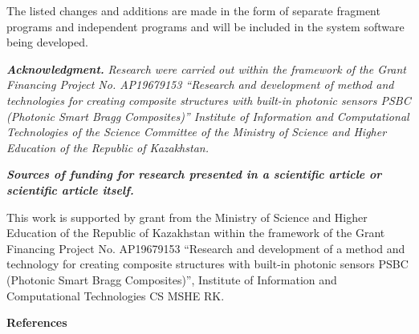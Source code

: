 \begin{multicols}{2}
The listed changes and additions are made in the form of separate
fragment programs and independent programs and will be included in the
system software being developed.

\emph{{\bfseries Acknowledgment.}} \emph{Research were carried out within
the framework of the Grant Financing Project No. AP19679153 ``Research
and development of method and technologies for creating composite
structures with built-in photonic sensors PSBC (Photonic Smart Bragg
Composites)'' Institute of Information and Computational Technologies of
the Science Committee of the Ministry of Science and Higher Education of
the Republic of Kazakhstan.}

\emph{{\bfseries Sources of funding for research presented in a scientific
article or scientific article itself.}}

This work is supported by grant from the Ministry of Science and Higher
Education of the Republic of Kazakhstan within the framework of the
Grant Financing Project No. AP19679153 ``Research and development of a
method and technology for creating composite structures with built-in
photonic sensors PSBC (Photonic Smart Bragg Composites)'', Institute of
Information and Computational Technologies CS MSHE RK.
\end{multicols}

\begin{center}
{\bfseries References}
\end{center}

